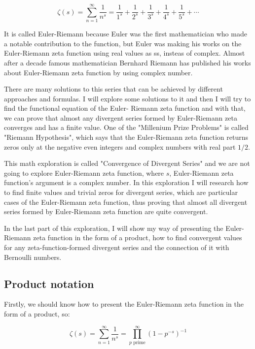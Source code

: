 \documentclass[a4paper]{article}
\begin{document}
\begin{equation*}
  \zeta(s)=\sum_{n=1}^{\infty} \frac{1}{n^s}=\frac{1}{1^s}+\frac{1}{2^s}+\frac{1}{3^s}+
  \frac{1}{4^s}+\frac{1}{5^s}+\cdots
  \end{equation*}

It is called Euler-Riemann because Euler was the first mathematician who made a
notable contribution to the function, but Euler was making his works on the
Euler-Riemann zeta function using real values as ss, insteas of complex. Almost
after a decade famous mathematician Bernhard Riemann has published his works
about Euler-Riemann zeta function by using complex number.

There are many solutions to this series that can be achieved by different
approaches and formulas. I will explore some solutions to it and then I will try
to find the functional equation of the Euler- Riemann zeta function and with
that, we can prove that almost any divergent series formed by Euler-Riemann zeta
converges and has a finite value. One of the "Millenium Prize Problems" is
called "Riemann Hypothesis", which says that the Euler-Riemann zeta function
returns zeros only at the negative even integers and complex numbers with real
part \(1/2\).  

This math exploration is called "Convergence of Divergent Series" and we are not
going to explore Euler-Riemann zeta function, where \(s\), Euler-Riemann zeta
function's argument is a complex number. In this exploration I will research how
to find finite values and trivial zeros for divergent series, which are
particular cases of the Euler-Riemann zeta function, thus proving that almost
all divergent series formed by Euler-Riemann zeta function are quite
convergent. 

In the last part of this exploration, I will show my way of presenting the
Euler-Riemann zeta function in the form of a product, how to find convergent
values for any zeta-function-formed divergent series and the connection of it
with Bernoulli numbers. 

\subsection{Product notation}
\label{sec:orgf34b8df}

Firstly, we should know how to present the Euler-Riemann zeta function in the
form of a product, so:

\begin{equation}
  \zeta(s)=\sum_{n=1}^{\infty} \frac{1}{n^s}=\prod_{p \text{ prime}}^{\infty} (1-p^{-s})^{-1}
\end{equation}
\end{document}
